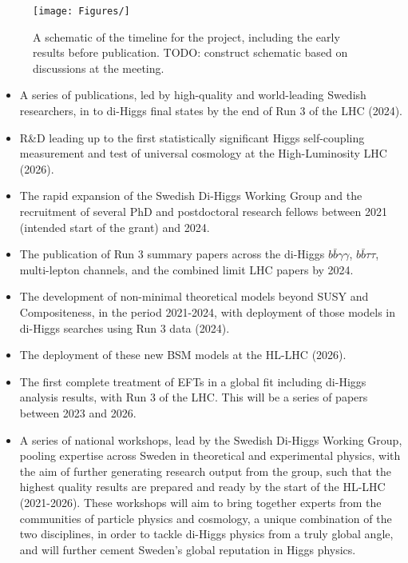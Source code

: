 \documentclass[10pt,oneside,notitlepage,abstracton,a4paper]{scrartcl}
\begin{document}
\begin{figure}[!ht]
\centering
\texttt{[image: Figures/]}
\caption{A schematic of the timeline for the project, including the early results before publication. TODO: construct schematic based on discussions at the meeting.}
\label{fig:timeline}
\end{figure}

\begin{itemize}
\item A series of publications, led by high-quality and world-leading Swedish researchers, in to di-Higgs final states by the end of Run 3 of the LHC (2024).
\item R&D leading up to the first statistically significant Higgs self-coupling measurement and test of universal cosmology at the High-Luminosity LHC (2026). 
\item The rapid expansion of the Swedish Di-Higgs Working Group and the recruitment of several PhD and postdoctoral research fellows between 2021 (intended start of the grant) and 2024. 
\item The publication of Run 3 summary papers across the di-Higgs $b\bar{b}\gamma\gamma$, $b\bar{b}\tau\tau$, multi-lepton channels, and the combined limit LHC papers by 2024.
\item The development of non-minimal theoretical models beyond SUSY and Compositeness, in the period 2021-2024, with deployment of those models in di-Higgs searches using Run 3 data (2024).
\item The deployment of these new BSM models at the HL-LHC (2026).
\item The first complete treatment of EFTs in a global fit including di-Higgs analysis results, with Run 3 of the LHC. This will be a series of papers between 2023 and 2026. 
\item A series of national workshops, lead by the Swedish Di-Higgs Working Group, pooling  expertise across Sweden in theoretical and experimental physics, with the aim of further generating research output from the group, such that the highest quality results are prepared and ready by the start of the HL-LHC (2021-2026). These workshops will aim to bring together experts from the communities of particle physics and cosmology, a unique combination of the two disciplines, in order to tackle di-Higgs physics from a truly global angle, and will further cement Sweden's global reputation in Higgs physics. 
\end{itemize}
\end{document}
